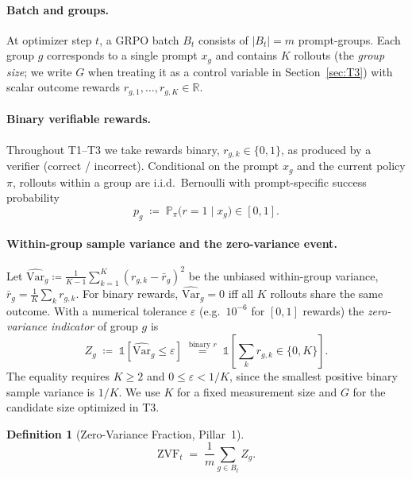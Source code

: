 \documentclass[11pt]{article}
\theoremstyle{plain}
\theoremstyle{definition}
\newtheorem{definition}{Definition}
\theoremstyle{remark}
\newcommand{\ZVF}{\ensuremath{\mathrm{ZVF}}}
\newcommand{\Varhat}{\ensuremath{\widehat{\mathrm{Var}}}}
\newcommand{\Prob}{\mathbb{P}}
\newcommand{\R}{\mathbb{R}}
\newcommand{\1}{\mathbb{1}}
\begin{document}
\paragraph{Batch and groups.} At optimizer step $t$, a GRPO batch $B_t$
consists of $|B_t| = m$ prompt-groups. Each group $g$ corresponds to a single
prompt $x_g$ and contains $K$ rollouts (the \emph{group size}; we write $G$
when treating it as a control variable in Section~\ref{sec:T3}) with scalar
outcome rewards $r_{g,1},\dots,r_{g,K} \in \R$.

\paragraph{Binary verifiable rewards.} Throughout T1--T3 we take rewards
binary, $r_{g,k}\in\{0,1\}$, as produced by a verifier (correct / incorrect).
Conditional on the prompt $x_g$ and the current policy $\pi$, rollouts within a
group are i.i.d.\ Bernoulli with prompt-specific success probability
\[
p_g \;\coloneqq\; \Prob_{\pi}\!\big(r=1 \mid x_g\big) \in [0,1].
\]

\paragraph{Within-group sample variance and the zero-variance event.} Let
$\Varhat_g \coloneqq \frac{1}{K-1}\sum_{k=1}^{K}(r_{g,k}-\bar r_g)^2$ be the
unbiased within-group variance, $\bar r_g = \frac1K\sum_k r_{g,k}$. For binary
rewards, $\Varhat_g = 0$ iff all $K$ rollouts share the same outcome. With a
numerical tolerance $\varepsilon$ (e.g.\ $10^{-6}$ for $[0,1]$ rewards) the
\emph{zero-variance indicator} of group $g$ is
\begin{equation}\label{eq:zv-indicator}
Z_g \;\coloneqq\; \1\!\left[\Varhat_g \le \varepsilon\right]
\;\overset{\text{binary } r}{=}\; \1\!\left[\textstyle\sum_k r_{g,k} \in \{0,K\}\right].
\end{equation}
The equality requires $K\ge2$ and $0\le\varepsilon<1/K$, since the
smallest positive binary sample variance is $1/K$. We use $K$ for a fixed
measurement size and $G$ for the candidate size optimized in T3.

\begin{definition}[Zero-Variance Fraction, Pillar~1]\label{def:zvf}
\[
\ZVF_t \;=\; \frac{1}{m}\sum_{g\in B_t} Z_g .
\]
\end{definition}
\end{document}
